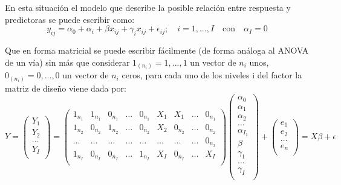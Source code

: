 \documentclass[
]{book}
\theoremstyle{definition}
\theoremstyle{definition}
\theoremstyle{definition}
\theoremstyle{remark}
\begin{document}
En esta situación el modelo que describe la posible relación entre respuesta y predictoras se puede escribir como:
\begin{equation}
y_{ij} = \alpha_0 + \alpha_i + \beta x_{ij} + \gamma_i x_{ij} + \epsilon_{ij};\quad  i=1,...,I \quad \text{con} \quad \alpha_I = 0
\label{eq:ancova}
\end{equation}

Que en forma matricial se puede escribir fácilmente (de forma análoga al ANOVA de un vía) sin más que considerar \(1_(n_i )={1,...,1}\) un vector de \(n_i\) unos, \(0_(n_i )={0,...,0}\) un vector de \(n_i\) ceros, para cada uno de los niveles i del factor la matriz de diseño viene dada por:
\[
Y = \left( 
\begin{array}{c}
   Y_1 \\
   Y_2 \\
   \ldots \\
   Y_I \\
\end{array}
\right)
=
\left( 
\begin{array}{ccccccccc}
   1_{n_1} & 1_{n_1} & 0_{n_1} & \ldots & 0_{n_1} & X_1 & X_1 & \ldots & 0_{n_1}\\
   1_{n_2} & 0_{n_2} & 1_{n_2} & \ldots & 0_{n_2} & X_2 & 0_{n_2} & \ldots & 0_{n_2}\\
   \ldots & \ldots & \ldots & \ldots & \ldots & \ldots & \ldots & \ldots & 0_{n_3}\\
   1_{n_I} & 0_{n_I} & 0_{n_I} &\ldots & 1_{n_I} & X_I & 0_{n_I} & \ldots & X_I\\
\end{array}
\right)
\left( 
\begin{array}{c}
   \alpha_0 \\
   \alpha_1 \\
  \alpha_2 \\
 \ldots \\
   \alpha_{I_1} \\
   \beta \\
   \gamma_1\\
   \ldots\\
   \gamma_I\\
\end{array}
\right)
+
\left( 
\begin{array}{c}
   e_1 \\
   e_2 \\
   \ldots \\
   e_n \\
\end{array}
\right) = X\beta + \epsilon
\]
\end{document}
